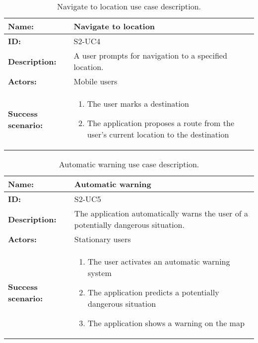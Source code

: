 \begin{table}[htbp]
    \centering
    \begin{tabularx}{\textwidth}{lX}
        \toprule
        \textbf{Name:}  & Navigate to location \\ \midrule
        \textbf{ID:}    & S2-UC4 \\ \midrule
        \textbf{Description:} & A user prompts for navigation to a specified location. \\ \midrule
        \textbf{Actors:} & Mobile users \\ \midrule
        \textbf{Success scenario:} & 
        \begin{enumerate}
            \item The user marks a destination
            \item The application proposes a route from the user's current location to the destination
        \end{enumerate}
        \\ \bottomrule
    \end{tabularx}
    \caption{Navigate to location use case description.}
    \label{tab:s2-uc4}
\end{table}

\begin{table}[htbp]
    \centering
    \begin{tabularx}{\textwidth}{lX}
        \toprule
        \textbf{Name:}  & Automatic warning \\ \midrule
        \textbf{ID:}    & S2-UC5 \\ \midrule
        \textbf{Description:} & The application automatically warns the user of a potentially dangerous situation. \\ \midrule
        \textbf{Actors:} & Stationary users \\ \midrule
        \textbf{Success scenario:} & 
        \begin{enumerate}
            \item The user activates an automatic warning system
            \item The application predicts a potentially dangerous situation
            \item The application shows a warning on the map
        \end{enumerate}
        \\ \bottomrule
    \end{tabularx}
    \caption{Automatic warning use case description.}
    \label{tab:s2-uc5}
\end{table}

